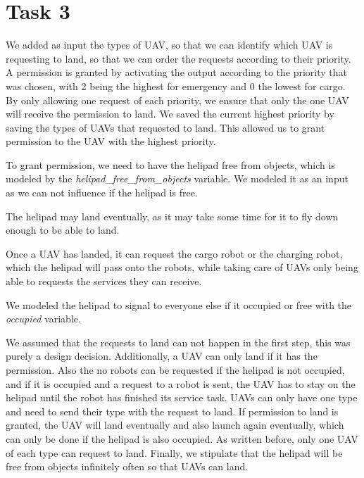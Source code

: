\documentclass[	runningheads,
    a4paper]{llncs}
\begin{document}
    \section*{Task 3}

    We added as input the types of UAV, so that we can identify which UAV is requesting to land, so that we can order the requests according to their priority. A permission is granted by activating the output according to the priority that was chosen, with 2 being the highest for emergency and 0 the lowest for cargo. By only allowing one request of each priority, we ensure that only the one UAV will receive the permission to land.
    We saved the current highest priority by saving the types of UAVs that requested to land. This allowed us to grant permission to the UAV with the highest priority.

    To grant permission, we need to have the helipad free from objects, which is modeled by the \textit{helipad\_free\_from\_objects} variable. We modeled it as an input as we can not influence if the helipad is free.

    The helipad may land eventually, as it may take some time for it to fly down enough to be able to land.

    Once a UAV has landed, it can request the cargo robot or the charging robot, which the helipad will pass onto the robots, while taking care of UAVs only being able to requests the services they can receive.

    We modeled the helipad to signal to everyone else if it occupied or free with the \textit{occupied} variable.

    We assumed that the requests to land can not happen in the first step, this was purely a design decision.
    Additionally, a UAV can only land if it has the permission.
    Also the no robots can be requested if the helipad is not occupied, and if it is occupied and a request to a robot is sent, the UAV has to stay on the helipad until the robot has finished its service task.
    UAVs can only have one type and need to send their type with the request to land.
    If permission to land is granted, the UAV will land eventually and also launch again eventually, which can only be done if the helipad is also occupied.
    As written before, only one UAV of each type can request to land.
    Finally, we stipulate that the helipad will be free from objects infinitely often so that UAVs can land.
\end{document}
